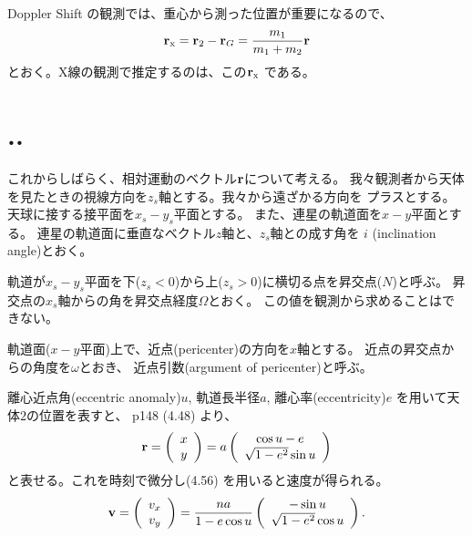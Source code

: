 Doppler Shift の観測では、重心から測った位置が重要になるので、
\begin{equation}
  {\bf r}_{\rm x} = {\bf r}_2 - {\bf r}_G
  = \frac{m_1}{m_1 + m_2} {\bf r}
\end{equation}
とおく。X線の観測で推定するのは、この${\bf r}_{\rm x}$ である。

\section{..}

これからしばらく、相対運動のベクトル${\bf r}$について考える。
我々観測者から天体を見たときの視線方向を$z_s$軸とする。我々から遠ざかる方向を
プラスとする。天球に接する接平面を$x_s-y_s$平面とする。
また、連星の軌道面を$x-y$平面とする。
連星の軌道面に垂直なベクトル$z$軸と、$z_s$軸との成す角を
$i$ (inclination angle)とおく。

軌道が$x_s-y_s$平面を下($z_s<0$)から上($z_s>0$)に横切る点を昇交点($N$)と呼ぶ。
昇交点の$x_s$軸からの角を昇交点経度$\Omega$とおく。
この値を観測から求めることはできない。

軌道面($x-y$平面)上で、近点(pericenter)の方向を$x$軸とする。
近点の昇交点からの角度を$\omega$とおき、
近点引数(argument of pericenter)と呼ぶ。

離心近点角(eccentric anomaly)$u$, 軌道長半径$a$,
離心率(eccentricity)$e$ を用いて天体$2$の位置を表すと、
p148 (4.48) より、
\begin{equation}
{\bf r} = 
\left( \begin{array}{c}
x \\
y \\
\end{array}
\right)
= a 
\left( \begin{array}{c}
\cos u - e \\
\sqrt{1 - e^2} \sin u \\
\end{array}
\right)
\end{equation}
と表せる。これを時刻で微分し(4.56) を用いると速度が得られる。
\begin{equation}
{\bf v} = 
\left( \begin{array}{c}
v_x \\
v_y \\
\end{array}
\right)
= \frac{n a}{1 - e \cos u} 
\left( \begin{array}{c}
-\sin u \\
\sqrt{1 - e^2} \cos u \\
\end{array}
\right).
\end{equation}

